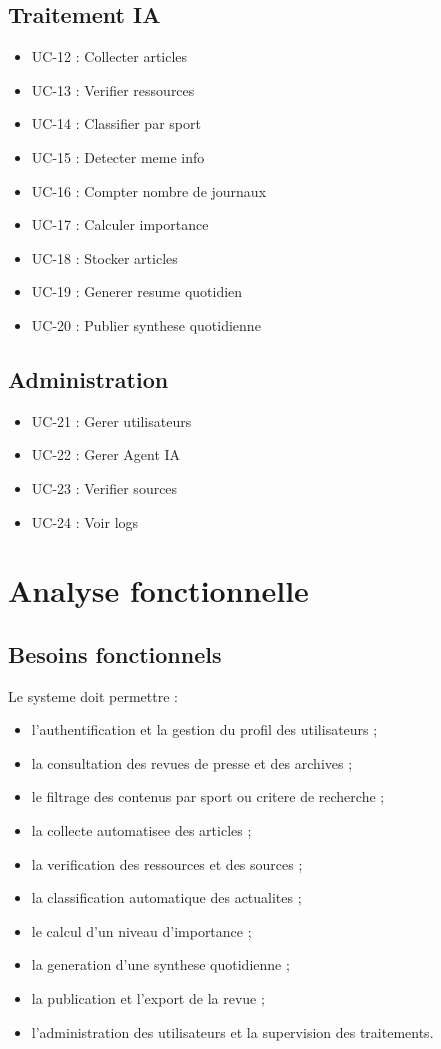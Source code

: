 \documentclass[12pt,a4paper,oneside]{report}
\begin{document}
\subsection{Traitement IA}
\begin{itemize}
\item UC-12 : Collecter articles
\item UC-13 : Verifier ressources
\item UC-14 : Classifier par sport
\item UC-15 : Detecter meme info
\item UC-16 : Compter nombre de journaux
\item UC-17 : Calculer importance
\item UC-18 : Stocker articles
\item UC-19 : Generer resume quotidien
\item UC-20 : Publier synthese quotidienne
\end{itemize}

\subsection{Administration}
\begin{itemize}
\item UC-21 : Gerer utilisateurs
\item UC-22 : Gerer Agent IA
\item UC-23 : Verifier sources
\item UC-24 : Voir logs
\end{itemize}

\section{Analyse fonctionnelle}
\subsection{Besoins fonctionnels}
Le systeme doit permettre :
\begin{itemize}
\item l'authentification et la gestion du profil des utilisateurs ;
\item la consultation des revues de presse et des archives ;
\item le filtrage des contenus par sport ou critere de recherche ;
\item la collecte automatisee des articles ;
\item la verification des ressources et des sources ;
\item la classification automatique des actualites ;
\item le calcul d'un niveau d'importance ;
\item la generation d'une synthese quotidienne ;
\item la publication et l'export de la revue ;
\item l'administration des utilisateurs et la supervision des traitements.
\end{itemize}
\end{document}
